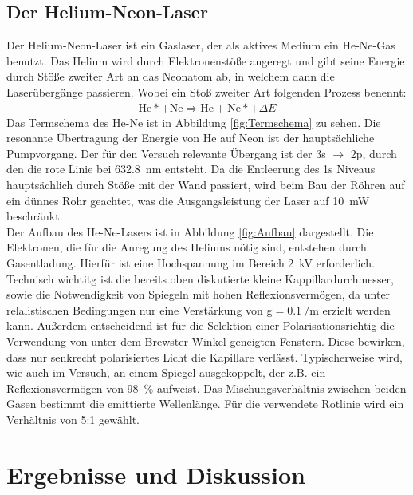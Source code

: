 \documentclass[a4paper,twoside,final]{article}
\begin{document}
\subsection{Der Helium-Neon-Laser}
Der Helium-Neon-Laser ist ein Gaslaser, der als aktives Medium ein He-Ne-Gas benutzt. Das Helium wird durch Elektronenstöße angeregt und gibt seine Energie durch Stöße zweiter Art an das Neonatom ab, in welchem dann die Laserübergänge passieren. Wobei ein Stoß zweiter Art folgenden Prozess benennt:
\begin{align}
  \text{He}* + \text{Ne} \Rightarrow \text{He}+\text{Ne}*+\Delta E
\end{align}
Das Termschema des He-Ne ist in Abbildung \ref{fig:Termschema} zu sehen.
Die resonante Übertragung der Energie von He auf Neon ist der hauptsächliche Pumpvorgang. Der für den Versuch relevante Übergang ist der 3s $\rightarrow$ 2p, durch den die rote Linie bei \SI{632,8}{\nano\meter} entsteht. Da die Entleerung des 1s Niveaus hauptsächlich durch Stöße mit der Wand passiert, wird beim Bau der Röhren auf ein dünnes Rohr geachtet, was die Ausgangsleistung der Laser auf \SI{10}{\milli\watt} beschränkt. \\
Der Aufbau des He-Ne-Lasers ist in Abbildung \ref{fig:Aufbau} dargestellt. Die Elektronen, die für die Anregung des Heliums nötig sind, entstehen durch Gasentladung. Hierfür ist eine Hochspannung im Bereich \SI{2}{\kilo\volt} erforderlich. Technisch wichtitg ist die bereits oben diskutierte kleine Kappillardurchmesser, sowie die Notwendigkeit von Spiegeln mit hohen Reflexionsvermögen, da unter relalistischen Bedingungen nur eine Verstärkung von g$=\SI{0,1}{\per\meter}$ erzielt werden kann. Außerdem entscheidend ist für die Selektion einer Polarisationsrichtig die Verwendung von unter dem Brewster-Winkel geneigten Fenstern. Diese bewirken, dass nur senkrecht polarisiertes Licht die Kapillare verlässt. Typischerweise wird, wie auch im Versuch, an einem Spiegel ausgekoppelt, der z.B. ein Reflexionsvermögen von \SI{98}{\percent} aufweist. Das Mischungsverhältnis zwischen beiden Gasen bestimmt die emittierte Wellenlänge. Für die verwendete Rotlinie wird ein Verhältnis von 5:1 gewählt.

\newpage
\section{Ergebnisse und Diskussion}\label{sec:ErgebnisseUndDiskussion}
\end{document}
